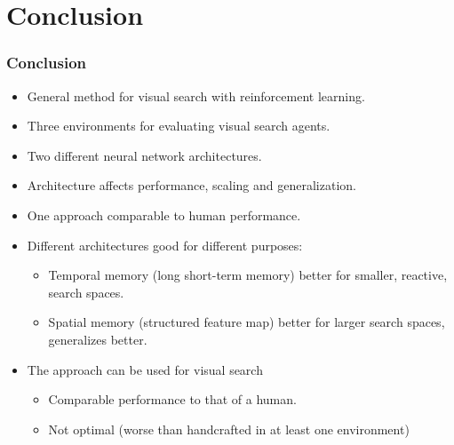 \section{Conclusion}

\begin{frame}
    \frametitle{Conclusion}

    \begin{itemize}
        \item General method for visual search with reinforcement learning.
        \item Three environments for evaluating visual search agents.
        \item Two different neural network architectures.
        \item Architecture affects performance, scaling and generalization.
        \item One approach comparable to human performance.
    \end{itemize}

    \begin{itemize}
        \item Different architectures good for different purposes:
        \begin{itemize}
            \item Temporal memory (long short-term memory) better for smaller, reactive, search spaces.
            \item Spatial memory (structured feature map) better for larger search spaces, generalizes better.
        \end{itemize}
        \item The approach can be used for visual search
        \begin{itemize}
            \item Comparable performance to that of a human.
            \item Not optimal (worse than handcrafted in at least one environment)
        \end{itemize}
    \end{itemize}
\end{frame}





